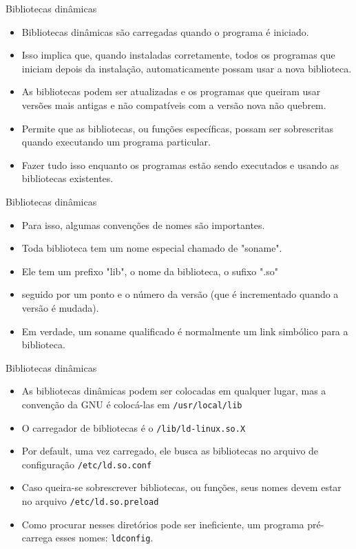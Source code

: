 \begin{frame}{Bibliotecas dinâmicas} 
  \begin{itemize}
   \item Bibliotecas dinâmicas são carregadas quando o programa é iniciado.
  \pause
  \item Isso implica que, quando instaladas corretamente, todos os 
        programas que iniciam depois da instalação, automaticamente 
        possam usar a nova biblioteca.
  \pause
  \item As bibliotecas podem ser atualizadas e os programas 
        que queiram usar versões mais antigas e não compatíveis com a 
        versão nova não quebrem.
  \pause
  \item Permite que as bibliotecas, ou funções específicas, possam ser sobrescritas
        quando executando um programa particular. 
  \pause
  \item Fazer tudo isso enquanto os programas estão sendo executados 
        e usando as bibliotecas existentes.
  \end{itemize}
\end{frame}


\begin{frame}{Bibliotecas dinâmicas} 
  \begin{itemize}
   \item Para isso, algumas convenções de nomes são importantes.
  \pause
  \item Toda biblioteca tem um nome especial chamado de "soname". 
  \pause
  \item Ele tem um prefixo "lib", o nome da biblioteca, o sufixo ".so"
  \item seguido por um ponto e o número da versão (que é incrementado quando
        a versão é mudada).
  \pause
  \item Em verdade, um soname qualificado é normalmente um link simbólico para a biblioteca.
  \end{itemize}
\end{frame}


\begin{frame}{Bibliotecas dinâmicas} 
  \begin{itemize}
   \item As bibliotecas dinâmicas podem ser colocadas em qualquer lugar, mas a 
         convenção da GNU é colocá-las em \texttt{/usr/local/lib}
  \pause
  \item O carregador de bibliotecas é o \texttt{/lib/ld-linux.so.X}
  \pause
  \item Por default, uma vez carregado, ele busca as bibliotecas no arquivo de 
        configuração \texttt{/etc/ld.so.conf}
  \pause
  \item Caso queira-se sobrescrever bibliotecas, ou funções, seus nomes devem estar no
        arquivo \texttt{/etc/ld.so.preload}
  \pause
  \item Como procurar nesses diretórios pode ser ineficiente, um programa pré-carrega
        esses nomes: \texttt{ldconfig}. 
  \end{itemize}
\end{frame}


